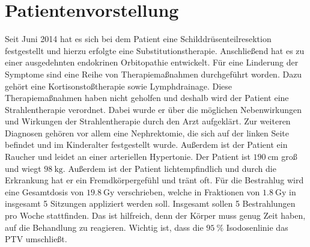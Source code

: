 \section{Patientenvorstellung}
\label{sec:Patientenvorstellung}
Seit Juni 2014 hat es sich bei dem Patient eine Schilddrüsenteilresektion festgestellt und hierzu erfolgte eine Substitutionstherapie. Anschließend hat es zu einer ausgedehnten endokrinen Orbitopathie entwickelt. Für eine Linderung der Symptome sind eine Reihe von Therapiemaßnahmen durchgeführt worden. Dazu gehört eine Kortisonstoßtherapie sowie Lymphdrainage. Diese Therapiemaßnahmen haben nicht geholfen und deshalb wird der Patient eine Strahlentherapie verordnet. Dabei wurde er über die möglichen Nebenwirkungen und Wirkungen der Strahlentherapie durch den Arzt aufgeklärt. Zur weiteren Diagnosen gehören vor allem eine Nephrektomie, die sich auf der linken Seite befindet und im Kinderalter festgestellt wurde. Außerdem ist der Patient ein Raucher und leidet an einer arteriellen Hypertonie. Der Patient ist $\SI{190}{\centi\meter}$ groß und wiegt $\SI{98}{\kilogram}$. Außerdem ist der Patient lichtempfindlich und durch die Erkrankung hat er ein Fremdkörpergefühl und tränt oft. Für die Bestrahlug wird eine Gesamtdosis von $\SI{19,8}{\gray}$ verschrieben, welche in Fraktionen von $\SI{1,8}{\gray}$ in insgesamt 5 Sitzungen appliziert werden soll. Insgesamt sollen 5 Bestrahlungen pro Woche stattfinden. Das ist hilfreich, denn der Körper muss genug Zeit haben, auf die Behandlung zu reagieren. Wichtig ist, dass die $\SI{95}{\percent}$ Isodosenlinie das PTV umschließt.